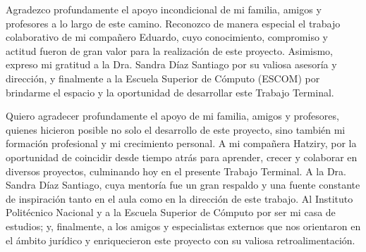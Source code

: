 \clearpage
\thispagestyle{empty}

\vspace*{2cm}
\vspace{1cm}

Agradezco profundamente el apoyo incondicional de mi familia, amigos y
profesores a lo largo de este camino. Reconozco de manera especial el
trabajo colaborativo de mi compañero Eduardo, cuyo conocimiento,
compromiso y actitud fueron de gran valor para la realización de este
proyecto. Asimismo, expreso mi gratitud a la Dra. Sandra Díaz Santiago
por su valiosa asesoría y dirección, y finalmente a la Escuela Superior
de Cómputo (ESCOM) por brindarme el espacio y la oportunidad de
desarrollar este Trabajo Terminal.

\medskip
\hfill\TTparticipanteB\par

\vspace{1.2cm}
Quiero agradecer profundamente el apoyo de mi familia, amigos y
profesores, quienes hicieron posible no solo el desarrollo de este
proyecto, sino también mi formación profesional y mi crecimiento
personal. A mi compañera Hatziry, por la oportunidad de coincidir desde
tiempo atrás para aprender, crecer y colaborar en diversos proyectos,
culminando hoy en el presente Trabajo Terminal. A la Dra. Sandra Díaz
Santiago, cuya mentoría fue un gran respaldo y una fuente constante de
inspiración tanto en el aula como en la dirección de este trabajo. Al
Instituto Politécnico Nacional y a la Escuela Superior de Cómputo por
ser mi casa de estudios; y, finalmente, a los amigos y especialistas
externos que nos orientaron en el ámbito jurídico y enriquecieron este
proyecto con su valiosa retroalimentación.

\medskip
\hfill\TTparticipanteA\par
\clearpage
